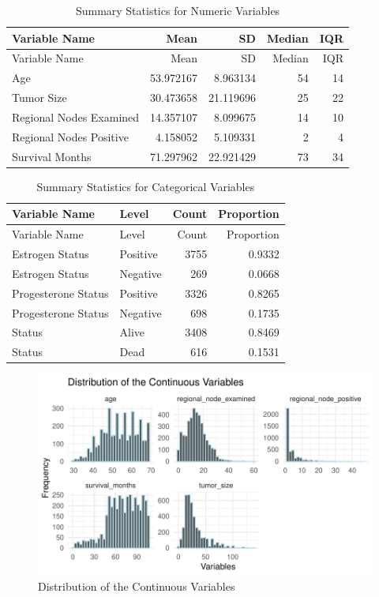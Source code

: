 \documentclass[
]{article}
\begin{document}
\begin{longtable}[]{@{}lrrrr@{}}
\caption{Summary Statistics for Numeric Variables}\tabularnewline
\toprule\noalign{}
Variable Name & Mean & SD & Median & IQR \\
\midrule\noalign{}
\endfirsthead
\toprule\noalign{}
Variable Name & Mean & SD & Median & IQR \\
\midrule\noalign{}
\endhead
\bottomrule\noalign{}
\endlastfoot
Age & 53.972167 & 8.963134 & 54 & 14 \\
Tumor Size & 30.473658 & 21.119696 & 25 & 22 \\
Regional Nodes Examined & 14.357107 & 8.099675 & 14 & 10 \\
Regional Nodes Positive & 4.158052 & 5.109331 & 2 & 4 \\
Survival Months & 71.297962 & 22.921429 & 73 & 34 \\
\end{longtable}

\begin{longtable}[]{@{}llrr@{}}
\caption{Summary Statistics for Categorical Variables}\tabularnewline
\toprule\noalign{}
Variable Name & Level & Count & Proportion \\
\midrule\noalign{}
\endfirsthead
\toprule\noalign{}
Variable Name & Level & Count & Proportion \\
\midrule\noalign{}
\endhead
\bottomrule\noalign{}
\endlastfoot
Estrogen Status & Positive & 3755 & 0.9332 \\
Estrogen Status & Negative & 269 & 0.0668 \\
Progesterone Status & Positive & 3326 & 0.8265 \\
Progesterone Status & Negative & 698 & 0.1735 \\
Status & Alive & 3408 & 0.8469 \\
Status & Dead & 616 & 0.1531 \\
\end{longtable}

\begin{figure}
\includegraphics[width=0.9\linewidth]{P8130_project_report_files/figure-latex/distribution_of_the_continuous_variables-1} \caption{Distribution of the Continuous Variables}\label{fig:distribution_of_the_continuous_variables}
\end{figure}
\end{document}
